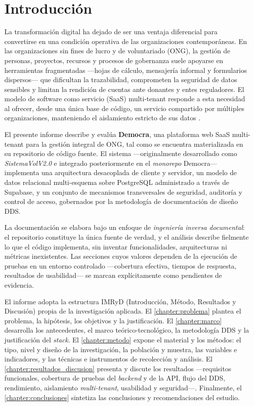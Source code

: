 \chapter*{Introducci\'on}
\label{chapter:introduccion}

La transformaci\'on digital ha dejado de ser una ventaja diferencial para convertirse en una condici\'on
operativa de las organizaciones contempor\'aneas. En las organizaciones sin fines de lucro y de
voluntariado (ONG), la gesti\'on de personas, proyectos, recursos y procesos de gobernanza suele
apoyarse en herramientas fragmentadas —hojas de c\'alculo, mensajer\'ia informal y formularios
dispersos— que dificultan la trazabilidad, comprometen la seguridad de datos sensibles y limitan la
rendici\'on de cuentas ante donantes y entes reguladores. El modelo de software como servicio (SaaS)
multi-tenant responde a esta necesidad al ofrecer, desde una \'unica base de c\'odigo, un servicio
compartido por m\'ultiples organizaciones, manteniendo el aislamiento estricto de sus datos
\citep{fowler2015, redhat2023}.

El presente informe describe y eval\'ua \textbf{Democra}, una plataforma web SaaS multi-tenant para la
gesti\'on integral de ONG, tal como se encuentra materializada en su repositorio de c\'odigo fuente. El
sistema —originalmente desarrollado como \textit{SistemaVolV2.0} e integrado posteriormente en el
\textit{monorepo} Democra— implementa una arquitectura desacoplada de cliente y servidor, un modelo
de datos relacional multi-esquema sobre PostgreSQL administrado a trav\'es de Supabase, y un conjunto
de mecanismos transversales de seguridad, auditor\'ia y control de acceso, gobernados por la
metodolog\'ia de documentaci\'on de dise\~no DDS.

La documentaci\'on se elabora bajo un enfoque de \textit{ingenier\'ia inversa documental}: el repositorio
constituye la \'unica fuente de verdad, y el an\'alisis describe fielmente lo que el c\'odigo implementa,
sin inventar funcionalidades, arquitecturas ni m\'etricas inexistentes. Las secciones cuyos valores
dependen de la ejecuci\'on de pruebas en un entorno controlado —cobertura efectiva, tiempos de
respuesta, resultados de usabilidad— se marcan expl\'icitamente como pendientes de evidencia.

El informe adopta la estructura IMRyD (Introducci\'on, M\'etodo, Resultados y Discusi\'on) propia de la
investigaci\'on aplicada. El \autoref{chapter:problema} plantea el problema, la hip\'otesis, los
objetivos y la justificaci\'on. El \autoref{chapter:marco} desarrolla los antecedentes, el marco
te\'orico-tecnol\'ogico, la metodolog\'ia DDS y la justificaci\'on del \textit{stack}. El
\autoref{chapter:metodo} expone el material y los m\'etodos: el tipo, nivel y dise\~no de la
investigaci\'on, la poblaci\'on y muestra, las variables e indicadores, y las t\'ecnicas e
instrumentos de recolecci\'on y an\'alisis. El \autoref{chapter:resultados_discusion} presenta y
discute los resultados —requisitos funcionales, cobertura de pruebas del \textit{backend} y de la API,
flujo del DDS, rendimiento, aislamiento \textit{multi-tenant}, usabilidad y seguridad—. Finalmente, el
\autoref{chapter:conclusiones} sintetiza las conclusiones y recomendaciones del estudio.
